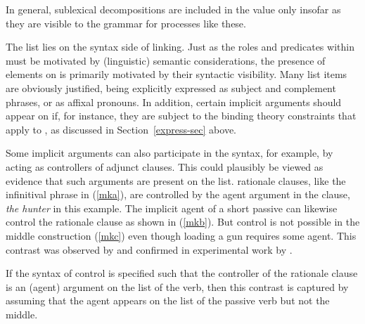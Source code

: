 \documentclass[output=paper,biblatex,babelshorthands,newtxmath,draftmode,colorlinks, citecolor=brown]{langscibook}
\begin{document}
\noindent
In general, sublexical decompositions are included in the \content value only insofar as they are visible to the grammar for processes like these.  

The \argst list lies on the syntax side of linking.  Just as the roles and predicates within \content must be motivated by (linguistic) semantic considerations, the presence of elements on \argst is primarily motivated by their syntactic visibility.  Many \argst list items are obviously justified, being explicitly expressed as subject and complement phrases, or as affixal pronouns.  In addition, certain implicit arguments should appear on \argst if, for instance, they are subject to the binding theory constraints that apply to \argst, as discussed in Section~\ref{express-sec} above.

Some implicit arguments can also participate in the syntax, for example, by acting as controllers of
adjunct clauses.  This could plausibly be viewed as evidence that such arguments are present on the
\argst list.   rationale clauses, like the infinitival phrase in
(\ref{mka}), are controlled by the agent argument in the clause, \textit{the
  hunter} in this example.  The implicit agent of a short passive can likewise control
the rationale clause as shown in (\ref{mkb}).  But control is not possible in the middle
construction (\ref{mkc}) even though loading a gun requires some agent.  This contrast was observed
by \citet{KeyserandRoeper1984} and confirmed in experimental work by \citet{MaunerandKoenig2000}.

\begin{exe}
\ex\label{mk}
\begin{xlist}
\end{xlist}
\end{exe}



\noindent
If the syntax of control  is specified such that the controller of the rationale clause is an (agent) argument on the \argst list of the verb, then this contrast is captured by assuming that the agent appears on the \argst list of the passive verb but not the middle.
\end{document}

